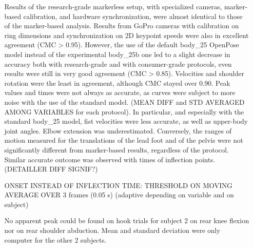 \clearpage
Results of the research-grade markerless setup, with specialized cameras, marker-based calibration, and hardware synchronization, were almost identical to those of the marker-based analysis. Results from GoPro cameras with calibration on ring dimensions and synchronization on 2D keypoint speeds were also in excellent agreement (CMC > 0.95). However, the use of the default body\_25 OpenPose model instead of the experimental body\_25b one led to a slight decrease in accuracy both with research-grade and with consumer-grade protocols, even results were still in very good agreement (CMC > 0.85). Velocities and shoulder rotation were the least in agreement, although CMC stayed over 0.90. Peak values and times were not always as accurate, as curves were subject to more noise with the use of the standard model. (MEAN DIFF and STD AVERAGED AMONG VARIABLES for each protocol). In particular, and especially with the standard body\_25 model, fist velocities were less accurate, as well as upper-body joint angles. Elbow extension was underestimated. Conversely, the ranges of motion measured for the translations of the lead foot and of the pelvis were not significantly different from marker-based results, regardless of the protocol. Similar accurate outcome was observed with times of inflection points. (DETAILLER DIFF SIGNIF?)

ONSET INSTEAD OF INFLECTION TIME: THRESHOLD ON MOVING AVERAGE OVER 3 frames (0.05 s) (adaptive depending on variable and on subject)


No apparent peak could be found on hook trials for subject 2 on rear knee flexion nor on rear shoulder abduction. Mean and standard deviation were only computer for the other 2 subjects.

